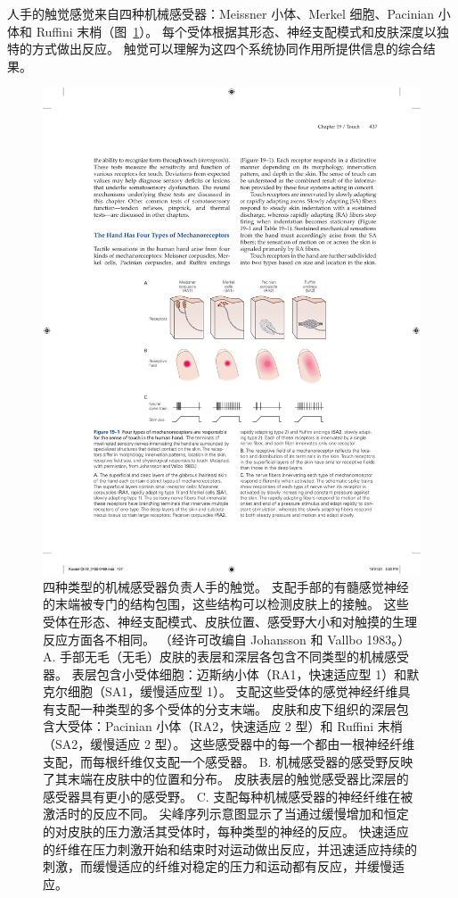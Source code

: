 人手的触觉感觉来自四种机械感受器：Meissner 小体、Merkel 细胞、Pacinian 小体和 Ruffini 末梢（图~\ref{fig:19_1}）。
每个受体根据其形态、神经支配模式和皮肤深度以独特的方式做出反应。
触觉可以理解为这四个系统协同作用所提供信息的综合结果。


\begin{figure}[htbp]
	\centering
	\includegraphics[width=1.0\linewidth]{chap19/fig_19_1}
	\caption{四种类型的机械感受器负责人手的触觉。
		支配手部的有髓感觉神经的末端被专门的结构包围，这些结构可以检测皮肤上的接触。
		这些受体在形态、神经支配模式、皮肤位置、感受野大小和对触摸的生理反应方面各不相同。 （经许可改编自 Johansson 和 Vallbo 1983。）
		A. 手部无毛（无毛）皮肤的表层和深层各包含不同类型的机械感受器。
		表层包含小受体细胞：迈斯纳小体（RA1，快速适应型 1）和默克尔细胞（SA1，缓慢适应型 1）。
		支配这些受体的感觉神经纤维具有支配一种类型的多个受体的分支末端。
		皮肤和皮下组织的深层包含大受体：Pacinian 小体（RA2，快速适应 2 型）和 Ruffini 末梢（SA2，缓慢适应 2 型）。
		这些感受器中的每一个都由一根神经纤维支配，而每根纤维仅支配一个感受器。
		B. 机械感受器的感受野反映了其末端在皮肤中的位置和分布。
		皮肤表层的触觉感受器比深层的感受器具有更小的感受野。
		C. 支配每种机械感受器的神经纤维在被激活时的反应不同。
		尖峰序列示意图显示了当通过缓慢增加和恒定的对皮肤的压力激活其受体时，每种类型的神经的反应。
		快速适应的纤维在压力刺激开始和结束时对运动做出反应，并迅速适应持续的刺激，而缓慢适应的纤维对稳定的压力和运动都有反应，并缓慢适应。}
	\label{fig:19_1}
\end{figure}


